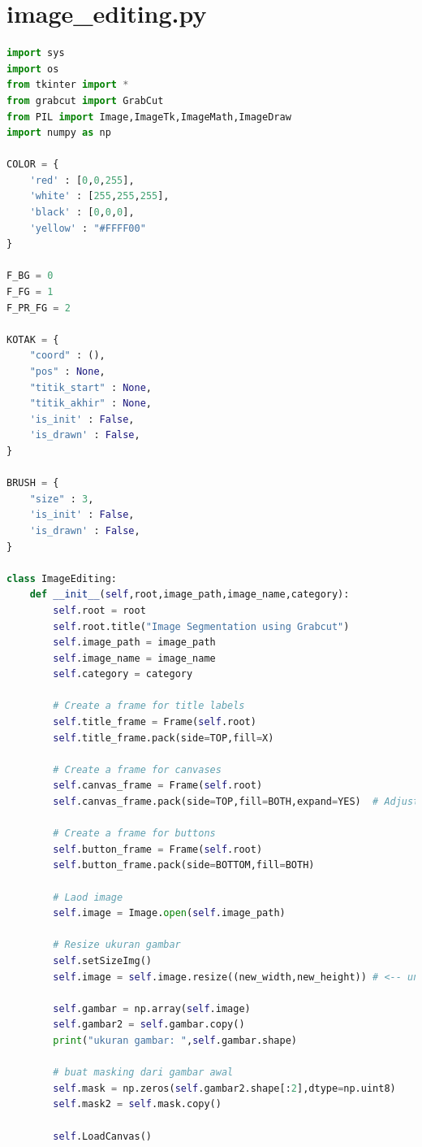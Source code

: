 \section{image\_editing.py}
\begin{lstlisting}[language=Python,basicstyle=\tiny]
import sys
import os
from tkinter import *
from grabcut import GrabCut
from PIL import Image,ImageTk,ImageMath,ImageDraw
import numpy as np

COLOR = {
    'red' : [0,0,255],
    'white' : [255,255,255],
    'black' : [0,0,0],
    'yellow' : "#FFFF00"
}

F_BG = 0
F_FG = 1
F_PR_FG = 2

KOTAK = {
    "coord" : (),
    "pos" : None,
    "titik_start" : None,
    "titik_akhir" : None,
    'is_init' : False,
    'is_drawn' : False,
}

BRUSH = {
    "size" : 3,
    'is_init' : False,
    'is_drawn' : False,
}

class ImageEditing:
    def __init__(self,root,image_path,image_name,category):
        self.root = root
        self.root.title("Image Segmentation using Grabcut")   
        self.image_path = image_path    
        self.image_name = image_name
        self.category = category

        # Create a frame for title labels
        self.title_frame = Frame(self.root)
        self.title_frame.pack(side=TOP,fill=X)

        # Create a frame for canvases
        self.canvas_frame = Frame(self.root)
        self.canvas_frame.pack(side=TOP,fill=BOTH,expand=YES)  # Adjusted to fill both X and Y,expand

        # Create a frame for buttons
        self.button_frame = Frame(self.root)
        self.button_frame.pack(side=BOTTOM,fill=BOTH)

        # Laod image
        self.image = Image.open(self.image_path)

        # Resize ukuran gambar
        self.setSizeImg() 
        self.image = self.image.resize((new_width,new_height)) # <-- untuk resize ukuran

        self.gambar = np.array(self.image)
        self.gambar2 = self.gambar.copy()
        print("ukuran gambar: ",self.gambar.shape)

        # buat masking dari gambar awal
        self.mask = np.zeros(self.gambar2.shape[:2],dtype=np.uint8)
        self.mask2 = self.mask.copy()

        self.LoadCanvas()


\end{lstlisting}
